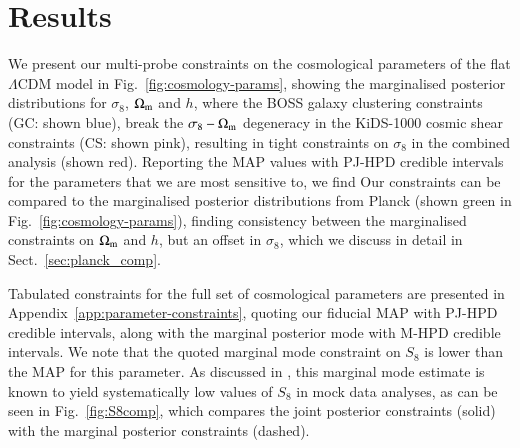 \section{Results}
\label{sec:results}
We present our multi-probe constraints on the cosmological parameters of the flat $\Lambda$CDM model in Fig.~\ref{fig:cosmology-params}, showing the marginalised posterior distributions for $\sigma_8$, $\Omega_{\rm m}$ and $h$, where the BOSS galaxy clustering constraints (GC: shown blue), break the $\sigma_8-\Omega_{\rm m}$ degeneracy in the KiDS-1000 cosmic shear constraints (CS: shown pink), resulting in tight constraints on $\sigma_8$ in the combined \tttp analysis (shown red). 
Reporting the MAP values with PJ-HPD credible intervals for the parameters that we are most sensitive to, we find 
Our constraints can be compared to the marginalised posterior distributions from Planck (shown green in Fig.~\ref{fig:cosmology-params}), finding consistency between the marginalised constraints on $\Omega_{\rm m}$ and $h$, but an offset in $\sigma_8$,  which we discuss in detail in Sect.~\ref{sec:planck_comp}.

Tabulated constraints for the full set of cosmological parameters are presented in Appendix~\ref{app:parameter-constraints}, quoting our fiducial MAP with PJ-HPD credible intervals, along with the marginal posterior mode with M-HPD credible intervals. 
We note that the quoted marginal mode constraint on $S_8$ is \preliminary{$0.2\sigma$} lower than the MAP for this parameter. 
As discussed in \citet{joachimi/etal:inprep}, this marginal mode estimate is known to yield systematically low values of $S_8$ in mock data analyses, as can be seen in Fig.~\ref{fig:S8comp}, which compares the joint posterior constraints (solid) with the marginal posterior constraints (dashed).  

